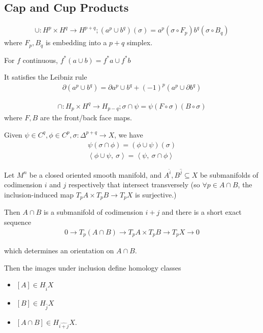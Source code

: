 \hypertarget{cap-and-cup-products}{%
\subsection{Cap and Cup Products}\label{cap-and-cup-products}}

\begin{align*}
\cup: H^p \times H^q \to H^{p+q}; (a^p \cup b^q)(\sigma) = a^p(\sigma \circ F_p) b^q(\sigma \circ B_q)
\end{align*}
where \(F_p, B_q\) is embedding into a \(p+q\) simplex.

For \(f\) continuous, \(f^*(a\cup b) = f^*a \cup f^*b\)

It satisfies the Leibniz rule
\begin{align*}{\partial}(a^p \cup b^q) = {\partial}a^p \cup b^q + (-1)^p(a^p\cup {\partial}b^q)\end{align*}

\begin{align*}
\cap: H_p \times H^q \to H_{p-q}; \sigma \cap \psi = \psi(F\circ\sigma)(B\circ \sigma)
\end{align*}
where \(F,B\) are the front/back face maps.

Given \(\psi \in C^q, \phi \in C^p, \sigma: \Delta^{p+q} \to X\), we
have
\begin{align*}
\psi(\sigma \cap \phi) = (\phi \cup \psi)(\sigma)\\
{\left\langle {\phi\cup \psi},~{\sigma} \right\rangle} = {\left\langle {\psi},~{\sigma \cap \phi} \right\rangle}
\end{align*}

Let \(M^n\) be a closed oriented smooth manifold, and
\(A^{\widehat{i}}, B^{\widehat{j}} \subseteq X\) be submanifolds of
codimension \(i\) and \(j\) respectively that intersect transversely (so
\(\forall p\in A\cap B\), the inclusion-induced map
\(T_pA \times T_p B \to T_p X\) is surjective.)

Then \(A\cap B\) is a submanifold of codimension \(i+j\) and there is a
short exact sequence
\begin{align*}
0 \to T_p(A\cap B) \to T_p A \times T_p B \to T_p X \to 0
\end{align*}

which determines an orientation on \(A\cap B\).

Then the images under inclusion define homology classes

\begin{itemize}
\tightlist
\item
  \([A] \in H_{\widehat{i}}X\)
\item
  \([B] \in H_{\widehat{j}}X\)
\item
  \([A\cap B] \in H_{\widehat{i+j}}X\).
\end{itemize}

